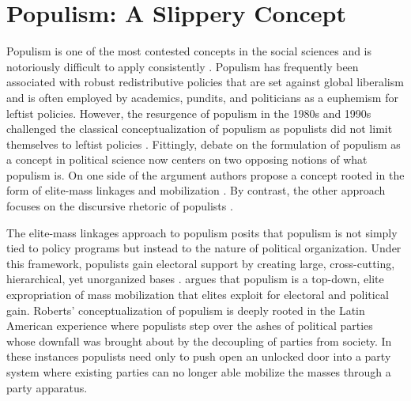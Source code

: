 \documentclass[a4paper,12pt]{article}\usepackage[]{graphicx}\usepackage[]{color}
\begin{document}
\section*{Populism: A Slippery Concept}
Populism is one of the most contested concepts in the social sciences and is notoriously difficult to apply consistently \citep{roberts1995neoliberalism, roberts2003social, hawkins2015mapping, weyland2001clarifying}. Populism has frequently been associated with robust redistributive policies that are set against global liberalism and is often employed by academics, pundits, and politicians as a euphemism for leftist policies. However, the resurgence of populism in the 1980s and 1990s challenged the classical conceptualization of populism as populists did not limit themselves to leftist policies \citep{weyland2001clarifying, roberts2016newsletter}. Fittingly, debate on the formulation of populism as a concept in political science now centers on two opposing notions of what populism is. On one side of the argument authors propose a concept rooted in the form of elite-mass linkages and mobilization \citep{weyland2001clarifying, roberts2014populism}. By contrast,  the other approach focuses on the discursive rhetoric of populists \citep{mudde2007populist, hawkins2015mapping}.
\par
The elite-mass linkages approach to populism posits that populism is not simply tied to policy programs but instead to the nature of political organization. Under this framework, populists gain electoral support by creating large, cross-cutting, hierarchical, yet unorganized bases \citep{weyland2001clarifying}. \citet{roberts2015populism} argues that populism is a top-down, elite expropriation of mass mobilization that elites exploit for electoral and political gain. Roberts' conceptualization of populism is deeply rooted in the Latin American experience where populists step over the ashes of political parties whose downfall was brought about by the decoupling of parties from society. In these instances populists need only to push open an unlocked door into a party system where existing parties can no longer able mobilize the masses through a party apparatus. 
\par
\end{document}
